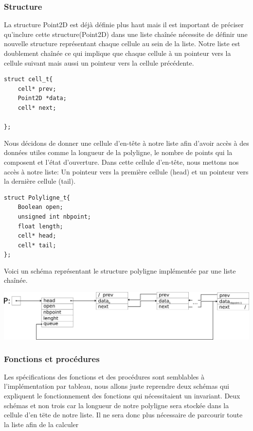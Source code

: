 \documentclass[a4paper, 11pt, oneside]{article}
\begin{document}
\subsubsection{Structure}

La structure Point2D est déjà définie plus haut mais il  est important de préciser qu'inclure cette structure(Point2D) dans une liste chaînée nécessite de définir une nouvelle structure représentant chaque cellule au sein de la liste. Notre liste est doublement chaînée ce qui implique que chaque cellule à un pointeur vers la cellule suivant mais aussi un pointeur vers la cellule précédente. 

\begin{lstlisting}
struct cell_t{
    cell* prev;
    Point2D *data;
    cell* next;

};
\end{lstlisting}


Nous décidons de donner une cellule d'en-tête à notre liste afin d'avoir accès à des données utiles comme la longueur de la polyligne, le nombre de points qui la composent et l'état d'ouverture. Dans cette cellule d'en-tête, nous mettons nos accès à notre liste: Un pointeur vers la première cellule (head) et un pointeur vers la dernière cellule (tail). 
\begin{lstlisting}
struct Polyligne_t{
    Boolean open;
    unsigned int nbpoint;
    float length;
    cell* head;
    cell* tail;
};
\end{lstlisting}

Voici un schéma représentant le structure polyligne implémentée par une liste chaînée.

\includegraphics[scale=0.7]{schemalist.png}

\subsubsection{Fonctions et procédures}

Les spécifications des fonctions et des procédures sont semblables à l'implémentation par tableau, nous allons juste reprendre deux schémas qui expliquent le fonctionnement des fonctions qui nécessitaient un invariant. Deux schémas et non trois car la longueur de notre polyligne sera stockée dans la cellule d'en tëte de notre liste. Il ne sera donc plus nécessaire de parcourir toute la liste afin de la calculer
\end{document}
